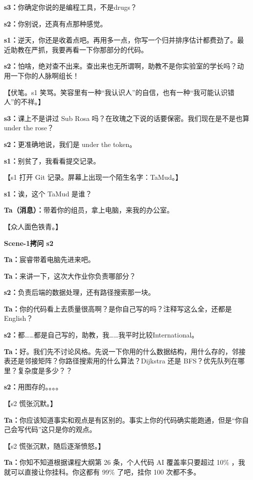 \documentclass[12pt]{article}
\newcommand{\scene}[2]{%
  \clearpage
  {\Large\bfseries #1\quad #2}\par
  \vspace{0.6em}
}
\newcommand{\dialogue}[2]{%
  \textbf{#1：}#2\par
}
\newcommand{\stage}[1]{%
  {\sffamily\color{gray}#1}\par
}
\begin{document}
\dialogue{s3}{你确定你说的是编程工具，不是drugs？}

\dialogue{s2}{你别说，还真有点那种感觉。}

\dialogue{s1}{逆天，你还是收着点吧。再用多一点，你写一个归并排序估计都费劲了。最近助教在严抓，我要再看一下你那部分的代码。}

\dialogue{s2}{怕啥，绝对查不出来。查出来也无所谓啊，助教不是你实验室的学长吗？动用一下你的人脉啊组长！}

\stage{【伏笔。s1 笑骂。笑容里有一种“我认识人”的自信，也有一种“我可能认识错人”的不祥。】}

\dialogue{s3}{课上不是讲过 Sub Rosa 吗？在玫瑰之下说的话要保密。我们现在是不是也算 under the rose？}

\dialogue{s2}{更准确地说，我们是 under the token。}

\dialogue{s1}{别贫了，我看看提交记录。}

\stage{【s1 打开 Git 记录。屏幕上出现一个陌生名字：TaMud。】}

\dialogue{s1}{诶，这个 TaMud 是谁？}

\dialogue{Ta（消息）}{带着你的组员，拿上电脑，来我的办公室。}

\stage{【众人面色铁青。】}

\scene{Scene-1}{拷问 s2}

\dialogue{Ta}{宸睿带着电脑先进来吧。}

\dialogue{Ta}{来讲一下，这次大作业你负责哪部分？}

\dialogue{s2}{负责后端的数据处理，还有路径搜索那一块。}

\dialogue{Ta}{你的代码看上去质量很高啊？是你自己写的吗？注释写这么全，还都是English？}

\dialogue{s2}{都……都是自己写的，助教，我……我平时比较International。}

\dialogue{Ta}{好。我们先不讨论风格。先说一下你用的什么数据结构，用什么存的，邻接表还是邻接矩阵？你路径搜索用的什么算法？Dijkstra 还是 BFS？优先队列在哪里？复杂度是多少？？}

\dialogue{s2}{用图存的。。。。}

\stage{【s2 慌张沉默。】}

\dialogue{Ta}{你应该知道事实和观点是有区别的。事实上你的代码确实能跑通，但是“你自己会写代码”这只是你的观点。}

\stage{【s2 慌张沉默，随后逐渐愤怒。】}

\dialogue{Ta}{你知不知道根据课程大纲第 26 条，个人代码 AI 覆盖率只要超过 10\% ，我就可以直接让你挂科。你这都有 99\% 了吧，挂你 100 次都不多。}
\end{document}
